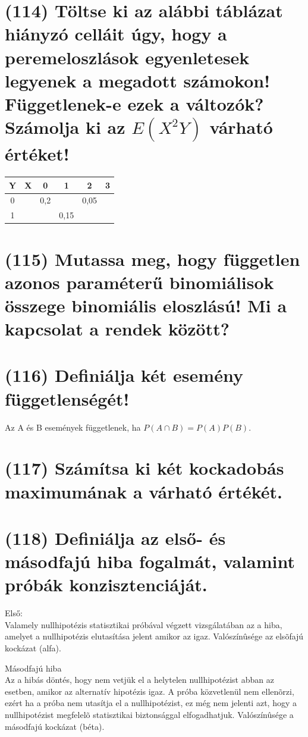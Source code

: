 \documentclass[12p]{article}
\begin{document}
\section{(114) Töltse ki az alábbi táblázat hiányzó celláit úgy, hogy a peremeloszlások egyenletesek
legyenek a megadott számokon! Függetlenek-e ezek a változók? Számolja ki az $E(X^2Y)$ várható értéket!}

\begin{center}
 \begin{tabular}{| c c || c | c | c | c |} 
 \hline
 Y & X &  0 & 1 & 2 & 3\\ [0.5ex] 
 \hline\hline
 0 &  & 0,2 & & 0,05 & \\ 
 \hline
 1 &  & & 0,15 & & \\
 \hline\hline
\end{tabular}
\end{center}

\section{(115) Mutassa meg, hogy független azonos paraméterű binomiálisok összege binomiális eloszlású! Mi a kapcsolat a rendek között?}

\section{(116) Definiálja két esemény függetlenségét!}

Az A és B események függetlenek, ha $P(A \cap B) = P(A)P(B)$.

\section{(117) Számítsa ki két kockadobás maximumának a várható értékét.}

\section{(118) Definiálja az első- és másodfajú hiba fogalmát, valamint próbák konzisztenciáját.}

Első:\\
Valamely nullhipotézis statisztikai próbával végzett vizsgálatában az a hiba, amelyet a nullhipotézis elutasítása jelent amikor az igaz. Valószínûsége az elsõfajú kockázat (alfa). 

Másodfajú hiba\\
Az a hibás döntés, hogy nem vetjük el a helytelen nullhipotézist abban az esetben, amikor az alternatív hipotézis igaz. A próba közvetlenül nem ellenõrzi, ezért ha a próba nem utasítja el a nullhipotézist, ez még nem jelenti azt, hogy a nullhipotézist megfelelõ statisztikai biztonsággal elfogadhatjuk. Valószínûsége a másodfajú kockázat (béta). 
\end{document}
